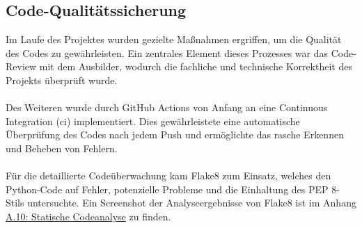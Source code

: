 \documentclass[a4paper,12pt]{article}
\begin{document}
\subsection{Code-Qualitätssicherung}
Im Laufe des Projektes wurden gezielte Maßnahmen ergriffen, um die Qualität des Codes zu gewährleisten. Ein zentrales Element dieses Prozesses war das Code-Review mit dem Ausbilder, wodurch die fachliche und technische Korrektheit des Projekts überprüft wurde.\\
\\
Des Weiteren wurde durch GitHub Actions von Anfang an eine Continuous Integration (\acrshort{ci}) implementiert. Dies gewährleistete eine automatische Überprüfung des Codes nach jedem Push und ermöglichte das rasche Erkennen und Beheben von Fehlern.\\
\\
Für die detaillierte Codeüberwachung kam Flake8 zum Einsatz, welches den Python-Code auf Fehler, potenzielle Probleme und die Einhaltung des PEP 8-Stils untersuchte. Ein Screenshot der Analyseergebnisse von Flake8 ist im Anhang \hyperref[sec:codeanalyse]{A.10: Statische Codeanalyse} zu finden.
\end{document}
